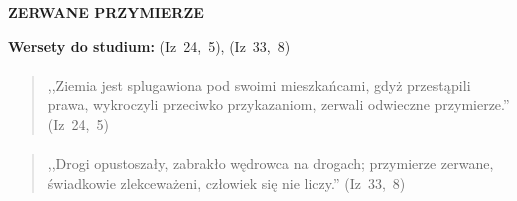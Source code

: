 \documentclass[10pt,a4paper,oneside]{article}
\begin{document}
\centerline{\textbf{\MakeUppercase{Zerwane przymierze}}}
\begin{center}
\textbf{Wersety do studium:} 
\mbox{(Iz 24, 5)}, \mbox{(Iz 33, 8)}
\end{center}
\paragraph{}
\begin{quote}
,,Ziemia jest splugawiona pod swoimi mieszkańcami, gdyż przestąpili prawa, wykroczyli przeciwko przykazaniom, zerwali odwieczne przymierze.'' \mbox{(Iz 24, 5)}
\end{quote}
\paragraph{}
\begin{quote}
,,Drogi opustoszały, zabrakło wędrowca na drogach; przymierze zerwane, świadkowie zlekceważeni, człowiek się nie liczy.'' \mbox{(Iz 33, 8)}
\end{quote}
\end{document}
